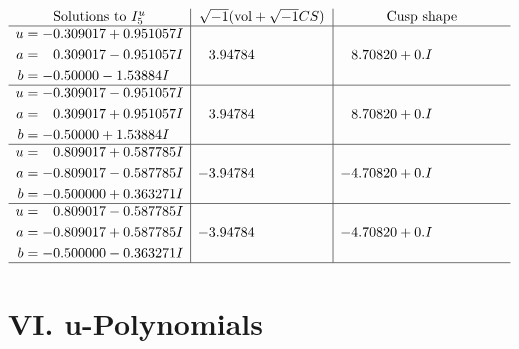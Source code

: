 \documentclass[1p]{elsarticle_modified}
\theoremstyle{definition}
\newcommand{\I}{\sqrt{-1}}
\begin{document}
$$\begin{array}{c|c|c}  
\text{Solutions to }I^u_{5}& \I (\text{vol} + \sqrt{-1}CS) & \text{Cusp shape}\\
 \hline 
\begin{aligned}
u &= -0.309017 + 0.951057 I \\
a &= \phantom{-}0.309017 - 0.951057 I \\
b &= -0.50000 - 1.53884 I\end{aligned}
 & \phantom{-}3.94784\phantom{ +0.000000I} & \phantom{-}8.70820 + 0. I\phantom{ +0.000000I} \\ \hline\begin{aligned}
u &= -0.309017 - 0.951057 I \\
a &= \phantom{-}0.309017 + 0.951057 I \\
b &= -0.50000 + 1.53884 I\end{aligned}
 & \phantom{-}3.94784\phantom{ +0.000000I} & \phantom{-}8.70820 + 0. I\phantom{ +0.000000I} \\ \hline\begin{aligned}
u &= \phantom{-}0.809017 + 0.587785 I \\
a &= -0.809017 - 0.587785 I \\
b &= -0.500000 + 0.363271 I\end{aligned}
 & -3.94784\phantom{ +0.000000I} & -4.70820 + 0. I\phantom{ +0.000000I} \\ \hline\begin{aligned}
u &= \phantom{-}0.809017 - 0.587785 I \\
a &= -0.809017 + 0.587785 I \\
b &= -0.500000 - 0.363271 I\end{aligned}
 & -3.94784\phantom{ +0.000000I} & -4.70820 + 0. I\phantom{ +0.000000I}\\
 \hline 
 \end{array}$$\newpage
\newpage\renewcommand{\arraystretch}{1}
\centering \section*{ VI. u-Polynomials}
\end{document}
